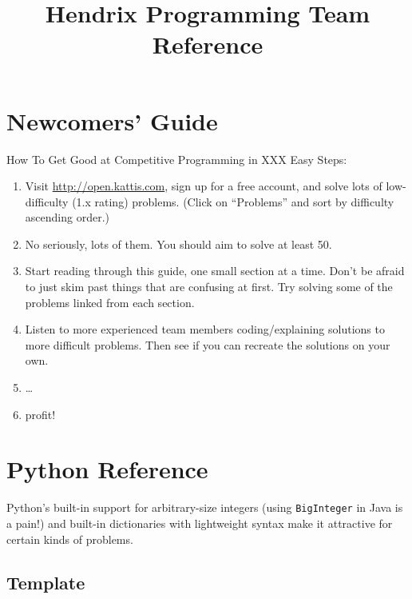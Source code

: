 \documentclass[10pt]{book}
\begin{document}
\title{Hendrix Programming Team Reference}
\maketitle

\tableofcontents
\newpage

\chapter{Newcomers' Guide} \label{chap:newcomers}

How To Get Good at Competitive Programming in XXX Easy Steps:

\begin{enumerate}
\item Visit \url{http://open.kattis.com}, sign up for a free account,
  and solve lots of low-difficulty (1.x rating) problems.  (Click on
  ``Problems'' and sort by difficulty ascending order.)
\item No seriously, lots of them. You should aim to solve at least 50.
\item Start reading through this guide, one small section at a time.
  Don't be afraid to just skim past things that are confusing at
  first. Try solving some of the problems linked from each section.
\item Listen to more experienced team members coding/explaining
  solutions to more difficult problems.  Then see if you can recreate
  the solutions on your own.
\item \dots
\item profit!
\end{enumerate}

\chapter{Python Reference} \label{chap:python}

Python's built-in support for arbitrary-size integers (using
\texttt{BigInteger} in Java is a pain!) and built-in dictionaries with
lightweight syntax make it attractive for certain kinds of problems.

\section{Template}
\end{document}
